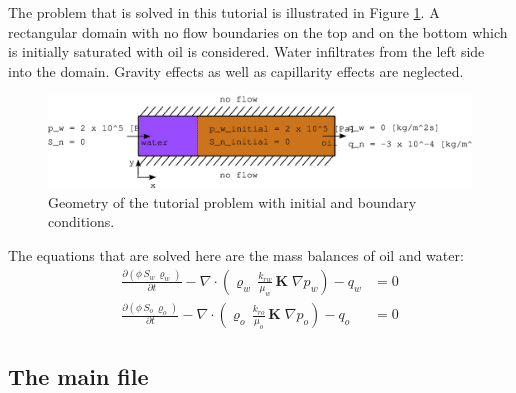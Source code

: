 The problem that is solved in this tutorial is illustrated in Figure \ref{tutorial-coupled:problemfigure}. A rectangular domain with no flow boundaries on the top and on the bottom which is initially saturated with oil is considered. Water infiltrates from the left side into the domain. Gravity effects as well as capillarity effects are neglected.

\begin{figure}[h]
\centering
\includegraphics[width=0.9\linewidth,keepaspectratio]{EPS/tutorial-problemconfiguration}
\caption{Geometry of the tutorial problem with initial and boundary conditions.}\label{tutorial-coupled:problemfigure}
\end{figure}

The equations that are solved here are the mass balances of oil and
water:
\begin{align}
  \label{massbalancewater}
  \frac {\partial (\phi \, S_{w}\, \varrho_{w})}{\partial t}
  -
  \nabla \cdot \left( \varrho_{w} \, \frac{k_{rw}}{\mu_{w}} \, \mathbf{K}\;\nabla p_w \right)
  -
  q_w
  & =
  0 \\
  \label{massbalanceoil}
  \frac {\partial (\phi \, S_{o}\, \varrho_{o})}{\partial t}
  -
  \nabla \cdot \left( \varrho_{o} \, \frac{k_{ro}}{\mu_{o}} \, \mathbf{K}\;\nabla p_o \right)
  -
  q_o 
  & =
  0
\end{align}

\subsection{The main file}

